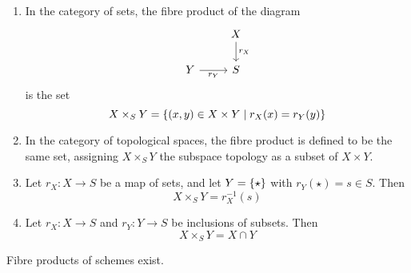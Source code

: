 \begin{example}
    \begin{enumerate}
        \item In the category of sets, the fibre product of the diagram
    \[\begin{tikzcd}
        & X \\
        Y & S
        \arrow["{r_X}", from=1-2, to=2-2]
        \arrow["{r_Y}"', from=2-1, to=2-2]
    \end{tikzcd}\]
        is the set
        \[ X \times_S Y = \qty{(x, y) \in X \times Y \mid r_X(x) = r_Y(y)} \]
        \item In the category of topological spaces, the fibre product is defined to be the same set, assigning \( X \times_S Y \) the subspace topology as a subset of \( X \times Y \).
        \item Let \( r_X : X \to S \) be a map of sets, and let \( Y = \qty{\star} \) with \( r_Y(\star) = s \in S \).
        Then
        \[ X \times_S Y = r_X^{-1}(s) \]
        \item Let \( r_X : X \to S \) and \( r_Y : Y \to S \) be inclusions of subsets.
        Then
        \[ X \times_S Y = X \cap Y \]
    \end{enumerate}
\end{example}
\begin{theorem}
    Fibre products of schemes exist.
\end{theorem}
